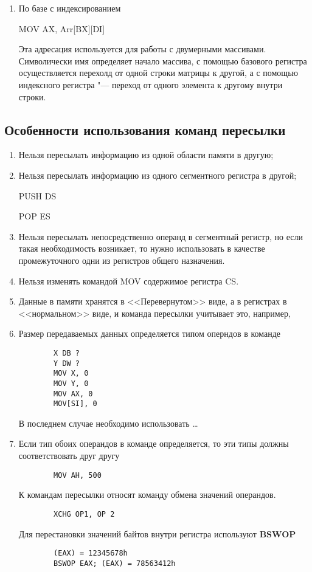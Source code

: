 \begin{enumerate}
    \item По базе с индексированием
    
    MOV AX, Arr[BX][DI]

    Эта адресация используется для работы с двумерными массивами. Символически имя определяет начало массива, с помощью базового регистра осуществляется перехолд от одной строки матрицы к другой, а с помощью индексного регистра "--- переход от одного элемента к другому внутри строки.
\end{enumerate}

\subsection{Особенности использования команд пересылки}
\begin{enumerate}
    \item Нельзя пересылать информацию из одной области памяти в другую;
    \item Нельзя пересылать информацию из одного сегментного регистра в другой;
    
    PUSH DS 

    POP ES

    \item Нельзя пересылать непосредственно операнд в сегментный регистр, но если такая необходимость возникает, то нужно использовать в качестве промежуточного одни из регистров общего назначения.
    \item Нельзя изменять командой MOV содержимое регистра CS.
    \item Данные в памяти хранятся в <<Перевернутом>> виде, а в регистрах в <<нормальном>> виде, и команда пересылки учитывает это, например,
    \item Размер передаваемых данных определяется типом оперндов в команде
    \begin{verbatim}
        X DB ?
        Y DW ?
        MOV X, 0
        MOV Y, 0
        MOV AX, 0
        MOV[SI], 0
    \end{verbatim}
    В последнем случае необходимо использовать \dots
    \item Если тип обоих операндов в команде определяется, то эти типы должны соответствовать друг другу
    \begin{verbatim}
        MOV AH, 500
    \end{verbatim}
    К командам пересылки относят команду обмена значений операндов.
    \begin{verbatim}
        XCHG OP1, OP 2
    \end{verbatim}

    Для перестановки значений байтов внутри регистра используют \textbf{BSWOP}
    \begin{verbatim}
        (EAX) = 12345678h
        BSWOP EAX; (EAX) = 78563412h
    \end{verbatim}
\end{enumerate}

